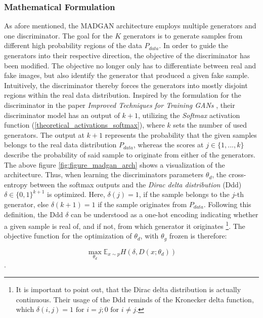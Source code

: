\subsubsection{Mathematical Formulation}
\label{theoretical_madgan_math}
As afore mentioned, the MADGAN architecture employs multiple generators and one discriminator. The goal for the \(K\) generators is to generate samples from different high probability regions of the data \(P_{data}\). In order to guide the generators into their respective direction, the objective of the discriminator has been modified. The objective no longer only has to differentiate between real and fake images, but also identify the generator that produced a given fake sample. Intuitively, the discriminator thereby forces the generators into mostly disjoint regions within the real data distribution. Inspired by the formulation for the discriminator in the paper \textit{Improved Techniques for Training GANs} \cite{salimans2016improvedtechniquestraininggans}, their discriminator model has an output of \(k+1\), utilizing the \textit{Softmax} activation function (\ref{theoretical_activations_softmax}), where \(k\) sets the number of used generators. The output at \(k+1\) represents the probability that the given samples belongs to the real data distribution \(P_{data}\), whereas the scores at \(j \in \{ 1, ..., k \}\) describe the probability of said sample to originate from either of the generators. The above figure \ref{fig:figure_madgan_arch} shows a visualization of the architecture. Thus, when learning the discriminators parameters \(\theta_d\), the cross-entropy between the softmax outputs and the \textit{Dirac delta distribution} (Ddd) \(\delta \in \{0, 1\}^{k+1}\) is optimized. Here, \(\delta(j) = 1\), if the sample belongs to the \(j\)-th generator, else \(\delta(k+1) = 1\) if the sample originates from \(P_{data}\). Following this definition, the Ddd \(\delta\) can be understood as a one-hot encoding indicating whether a given sample is real of, and if not, from which generator it originates \footnote{It is important to point out, that the Dirac delta distribution is actually continuous. Their usage of the Ddd reminds of the Kronecker delta function, which \( \delta(i,j) = 1 \text{ for } i=j; 0 \text{ for } i \ne j \).}. The objective function for the optimization of \(\theta_d\), with \(\theta_g\) frozen is therefore:

\begin{equation}
    \max\limits_{\theta_d}\mathbb{E}_{x \sim p} H(\delta, D(x; \theta_d))
\end{equation}.

